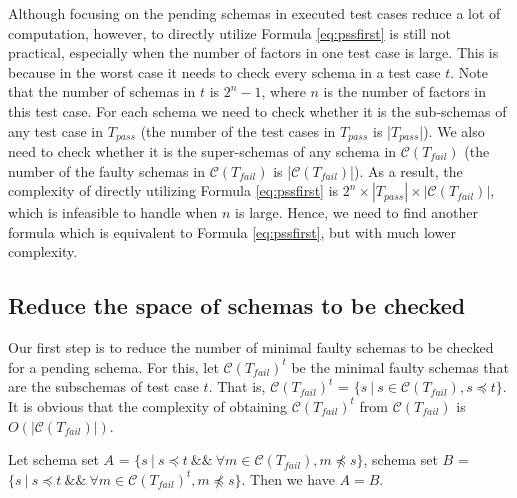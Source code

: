 Although focusing on the pending schemas in executed test cases reduce a lot of computation, however, to directly utilize Formula \ref{eq:pssfirst} is still not practical, especially when the number of factors in one test case is large. This is because in the worst case it needs to check every schema in a test case $t$. Note that the number of schemas in $t$ is $2^{n} - 1$, where $n$ is the number of factors in this test case. For each schema we need to check whether it is the sub-schemas of any test case in $T_{pass}$ (the number of the test cases in $T_{pass}$ is |$T_{pass}$|). We also need to check whether it is the super-schemas of any schema in $\mathcal{C}(T_{fail})$ (the number of the faulty schemas in $\mathcal{C}(T_{fail})$ is |$\mathcal{C}(T_{fail})$|). As a result, the complexity of directly utilizing Formula \ref{eq:pssfirst} is $2^{n} \times |T_{pass}| \times |\mathcal{C}(T_{fail})|$, which is infeasible to handle when $n$ is large. Hence, we need to find another formula which is equivalent to Formula \ref{eq:pssfirst}, but with much lower complexity.

\subsection{Reduce the space of schemas to be checked}
Our first step is to reduce the number of minimal faulty schemas to be checked for a pending schema.  For this, let $\mathcal{C}(T_{fail})^{t}$ be the minimal faulty schemas that are the subschemas of test case $t$. That is, $\mathcal{C}(T_{fail})^{t}$ = $\{ s\ | \ s \in \mathcal{C}(T_{fail}), s \preceq t \}$.  It is obvious that the complexity of obtaining $\mathcal{C}(T_{fail})^{t}$ from $\mathcal{C}(T_{fail})$ is $O(|\mathcal{C}(T_{fail})|)$.



\begin{proposition}\label{pro:mfssintequal}
Let schema set $A$ = $\{ s\ |\ s \preceq t\ \&\&\ \forall m \in \mathcal{C}(T_{fail}),  m \npreceq s \}$,  schema set $B$ = $\{ s\ |\ s \preceq t\ \&\&\ \forall m \in \mathcal{C}(T_{fail})^{t},  m \npreceq s \}$. Then we have $A = B$.
\end{proposition}

